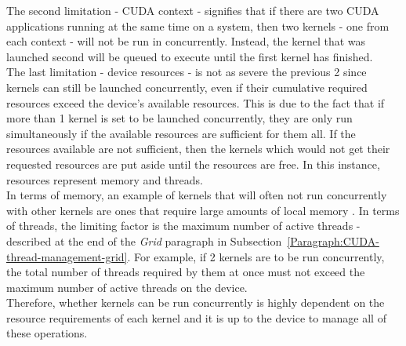 The second limitation - CUDA context - signifies that if there are two CUDA applications running at the same time on a system, then two kernels - one from each context - will not be run in concurrently. Instead, the kernel that was launched second will be queued to execute until the first kernel has finished. \\
The last limitation - device resources - is not as severe the previous 2 since kernels can still be launched concurrently, even if their cumulative required resources exceed the device's available resources. This is due to the fact that if more than 1 kernel is set to be launched concurrently, they are only run simultaneously if the available resources are sufficient for them all. If the resources available are not sufficient, then the kernels which would not get their requested resources are put aside until the resources are free. In this instance, resources represent memory and threads. \\
In terms of memory, an example of kernels that will often not run concurrently with other kernels are ones that require large amounts of local memory \cite{NVIDIAMay2022}. In terms of threads, the limiting factor is the maximum number of active threads - described at the end of the \textit{Grid} paragraph in Subsection~\ref{Paragraph:CUDA-thread-management-grid}. For example, if 2 kernels are to be run concurrently, the total number of threads required by them at once must not exceed the maximum number of active threads on the device. \\
Therefore, whether kernels can be run concurrently is highly dependent on the resource requirements of each kernel and it is up to the device to manage all of these operations.

